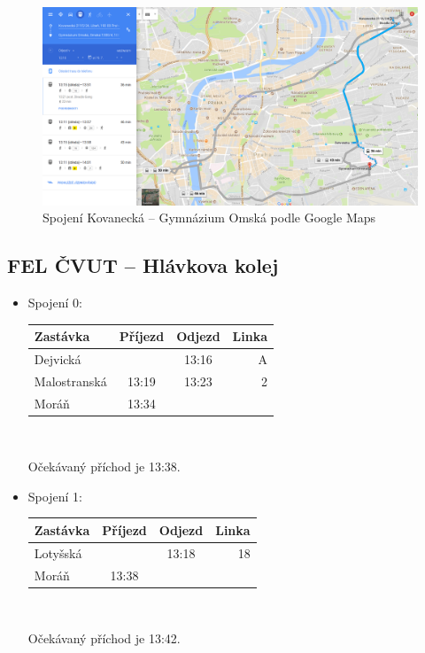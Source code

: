 \begin{figure}[h]
  \centering
    \includegraphics[width=\textwidth]{../img/kovanecka-omska-google.png}
  \caption{Spojení Kovanecká -- Gymnázium Omská podle Google Maps}
  \label{fig:kovanecka-omska-google}
\end{figure}

\clearpage
\subsection{FEL ČVUT -- Hlávkova kolej}
\begin{itemize}
\item Spojení 0:\\
\vspace*{-0.5cm}
\begin{center}
\begin{tabular}{|l c c r|}\hline
{\bf Zastávka}&{\bf Příjezd}&{\bf Odjezd}&{\bf Linka}\\\hline
Dejvická&&13:16&A\\
Malostranská&13:19&13:23&2\\
Moráň&13:34&&\\\hline
\end{tabular}\\[2mm]
\end{center}
Očekávaný příchod je 13:38.

\item Spojení 1:\\
\vspace*{-0.5cm}
\begin{center}
\begin{tabular}{|l c c r|}\hline
{\bf Zastávka}&{\bf Příjezd}&{\bf Odjezd}&{\bf Linka}\\\hline
Lotyšská&&13:18&18\\
Moráň&13:38&&\\\hline
\end{tabular}\\[2mm]
\end{center}
Očekávaný příchod je 13:42.
\end{itemize}


